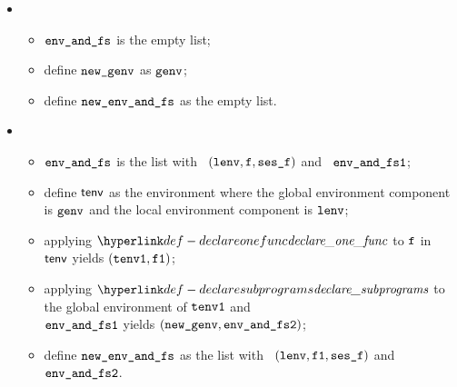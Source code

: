 \ProseParagraph
\OneApplies
\begin{itemize}
  \item {}
  \begin{itemize}
    \item $\texttt{env\_and\_fs}$ is the empty list;
    \item define $\texttt{new\_genv}$ as $\texttt{genv}$;
    \item define $\texttt{new\_env\_and\_fs}$ as the empty list.
  \end{itemize}

  \item {}
  \begin{itemize}
    \item $\texttt{env\_and\_fs}$ is the list with \head\ $(\texttt{lenv}, \texttt{f}, \texttt{ses\_f})$ and \tail\ $\texttt{env\_and\_fs1}$;
    \item define $\textsf{tenv}$ as the environment where the global environment component is $\texttt{genv}$ and the local environment component is $\texttt{lenv}$;
    \item applying $\declareonefunc$ to $\texttt{f}$ in $\textsf{tenv}$ yields $(\texttt{tenv1}, \texttt{f1})$\ProseOrTypeError;
    \item applying $\declaresubprograms$ to the global environment of $\texttt{tenv1}$ and \\
          $\texttt{env\_and\_fs1}$ yields $(\texttt{new\_genv}, \texttt{env\_and\_fs2})$\ProseOrTypeError;
    \item define $\texttt{new\_env\_and\_fs}$ as the list with \head\ $(\texttt{lenv}, \texttt{f1}, \texttt{ses\_f})$ and \tail\ $\texttt{env\_and\_fs2}$.
  \end{itemize}
\end{itemize}

\FormallyParagraph
{}

